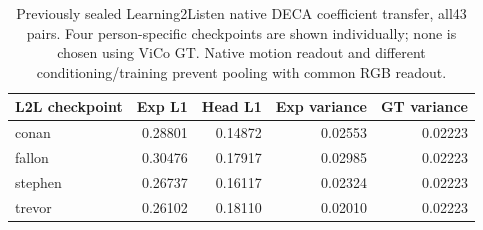 \begin{table}[H]
\centering\small
\caption{Previously sealed Learning2Listen native DECA coefficient transfer, all43 pairs. Four person-specific checkpoints are shown individually; none is chosen using ViCo GT. Native motion readout and different conditioning/training prevent pooling with common RGB readout.}
\label{tab:l2l-native}
\setlength{\tabcolsep}{4pt}
\begin{tabular}{lrrrr}
\toprule
L2L checkpoint & Exp L1 & Head L1 & Exp variance & GT variance \\
\midrule
conan & 0.28801 & 0.14872 & 0.02553 & 0.02223 \\
fallon & 0.30476 & 0.17917 & 0.02985 & 0.02223 \\
stephen & 0.26737 & 0.16117 & 0.02324 & 0.02223 \\
trevor & 0.26102 & 0.18110 & 0.02010 & 0.02223 \\
\bottomrule
\end{tabular}
\end{table}
